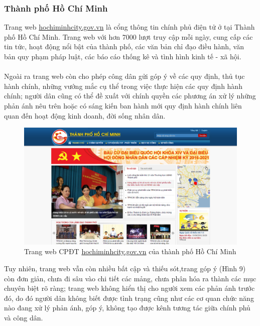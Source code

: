 \documentclass[a4paper]{article}
\begin{document}
\subsubsection{Thành phố Hồ Chí Minh}	
Trang web \url{hochiminhcity.gov.vn} là cổng thông tin chính phủ điện tử ở tại Thành phố Hồ Chí Minh. Trang web với hơn 7000 lượt truy cập mỗi ngày, cung cấp các tin tức, hoạt động nổi bật của thành phố, các văn bản chỉ đạo điều hành, văn bản quy phạm pháp luật, các báo cáo thống kê và tình hình kinh tế - xã hội.\\
\\
Ngoài ra trang web còn cho phép công dân gửi góp ý về các quy định, thủ tục hành chính, những vướng mắc cụ thể trong việc thực hiện các quy định hành chính; người dân cũng có thể đề xuất với chính quyền các phương án xử lý những phản ánh nêu trên hoặc có sáng kiến ban hành mới quy định hành chính liên quan đến hoạt động kinh doanh, đời sống nhân dân.
\begin{center}
    \begin{figure}[h]
    \begin{center}
     \includegraphics[scale=.4]{egov-tphcm.PNG}
    \end{center}
    \caption{Trang web CPĐT \url{hochiminhcity.gov.vn} của thành phố Hồ Chí Minh}
    \label{refhinh7}
    \end{figure}
\end{center}
Tuy nhiên, trang web vẫn còn nhiều bất cập và thiếu sót,trang góp ý (Hình 9) còn đơn giản, chưa đi sâu vào chi tiết các mảng, chưa phân hóa ra thành các mục chuyên biệt rõ ràng; trang web không hiển thị cho người xem các phản ánh trước đó, do đó người dân không biết được tình trạng cũng như các cơ quan chức năng nào đang xử lý phản ánh, góp ý, không tạo được kênh tương tác giữa chính phủ và công dân.
\newpage
\end{document}
